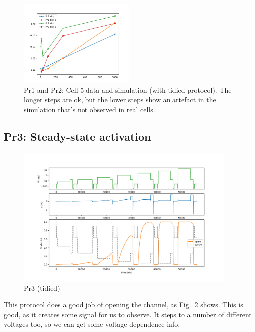 \documentclass[preprint,authoryear,10pt]{elsarticle}
\newcommand\fig[2][]{\hyperref[fig:#2]{Fig.~\ref*{fig:#2}\ifstrempty{#1}{}{.#1}}}
\begin{document}
\begin{figure}[H]
\centerline{
\includegraphics[width=0.5\textwidth]{fig/pr12-cell5-and-sim}
}
\caption{%
Pr1 and Pr2: Cell 5 data and simulation (with tidied protocol).
The longer steps are ok, but the lower steps show an artefact in the simulation
that's not observed in real cells.
}
\label{fig:pr12-cell5-and-sim}
\end{figure}

%
%
\subsection{Pr3: Steady-state activation}

\begin{figure}[H]
\centerline{
\includegraphics[width=0.95\textwidth]{fig/pr3-modified}
}
\caption{%
Pr3 (tidied)
}
\label{fig:analysis-pr3}
\end{figure}

This protocol does a good job of opening the channel, as \fig{analysis-pr3}
 shows.
This is good, as it creates some signal for us to observe.
It steps to a number of different voltages too, so we can get some voltage
 dependence info.
\end{document}
